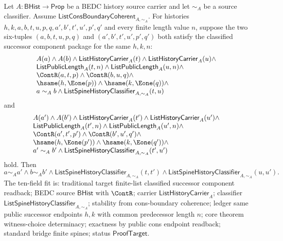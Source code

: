 \begin{theorem}
\label{thm:list-classified-successor-component-readback-determinacy}
Let $A:\mathsf{BHist}\to\mathsf{Prop}$ be a BEDC history source carrier and let
$\sim_A$ be a source classifier. Assume
$\mathsf{ListConsBoundaryCoherent}_{A,\sim_A}$. For histories
$h,k,a,b,t,u,p,q,a',b',t',u',p',q'$ and every finite length value $n$, suppose
the two six-tuples $(a,b,t,u,p,q)$ and $(a',b',t',u',p',q')$ both satisfy the
classified successor component package for the same $h,k,n$:
$$
\begin{array}{l}
A(a)\land A(b)\land
\mathsf{ListHistoryCarrier}_A(t)\land
\mathsf{ListHistoryCarrier}_A(u)\land\\
\mathsf{ListPublicLength}_A(t,n)\land
\mathsf{ListPublicLength}_A(u,n)\land\\
\ContR(a,t,p)\land \ContR(b,u,q)\land\\
\hsame(h,\Eone(p))\land \hsame(k,\Eone(q))\land\\
a\sim_A b\land
\mathsf{ListSpineHistoryClassifier}_{A,\sim_A}(t,u)
\end{array}
$$
and
$$
\begin{array}{l}
A(a')\land A(b')\land
\mathsf{ListHistoryCarrier}_A(t')\land
\mathsf{ListHistoryCarrier}_A(u')\land\\
\mathsf{ListPublicLength}_A(t',n)\land
\mathsf{ListPublicLength}_A(u',n)\land\\
\ContR(a',t',p')\land \ContR(b',u',q')\land\\
\hsame(h,\Eone(p'))\land \hsame(k,\Eone(q'))\land\\
a'\sim_A b'\land
\mathsf{ListSpineHistoryClassifier}_{A,\sim_A}(t',u')
\end{array}
$$
hold. Then
$$
a\sim_A a'\land b\sim_A b'\land
\mathsf{ListSpineHistoryClassifier}_{A,\sim_A}(t,t')\land
\mathsf{ListSpineHistoryClassifier}_{A,\sim_A}(u,u').
$$
The ten-field fit is: traditional target finite-list classified successor
component readback; BEDC source $\mathsf{BHist}$ with $\ContR$; carrier
$\mathsf{ListHistoryCarrier}_A$; classifier
$\mathsf{ListSpineHistoryClassifier}_{A,\sim_A}$; stability from
cons-boundary coherence; ledger same public successor endpoints $h,k$ with
common predecessor length $n$; core theorem witness-choice determinacy;
exactness by public cons endpoint readback; standard bridge finite spines;
status $\mathsf{ProofTarget}$.
\end{theorem}
